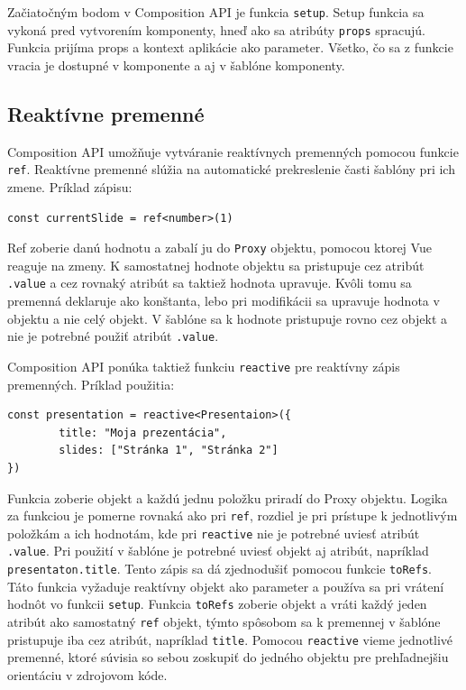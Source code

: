 Začiatočným bodom v Composition API je funkcia \texttt{setup}. Setup funkcia sa vykoná pred vytvorením komponenty, hneď ako sa atribúty \texttt{props} spracujú. Funkcia prijíma props a kontext aplikácie ako parameter. Všetko, čo sa z funkcie vracia je dostupné v komponente a aj v šablóne komponenty. 

\subsection*{Reaktívne premenné}
Composition API umožňuje vytváranie reaktívnych premenných pomocou funkcie \texttt{ref}. Reaktívne premenné slúžia na automatické prekreslenie časti šablóny pri ich zmene. Príklad zápisu: 
    \begin{verbatim}const currentSlide = ref<number>(1)\end{verbatim}
Ref zoberie danú hodnotu a zabalí ju do \texttt{Proxy} objektu, pomocou ktorej Vue reaguje na zmeny. K samostatnej hodnote objektu sa pristupuje cez atribút \texttt{.value} a cez rovnaký atribút sa taktiež hodnota upravuje. Kvôli tomu sa premenná deklaruje ako konštanta, lebo pri modifikácii sa upravuje hodnota v objektu a nie celý objekt. V šablóne sa k hodnote pristupuje rovno cez objekt a nie je potrebné použiť atribút \texttt{.value}. 

Composition API ponúka taktiež funkciu \texttt{reactive} pre reaktívny zápis premenných. Príklad použitia:
    \begin{verbatim}const presentation = reactive<Presentaion>({
        title: "Moja prezentácia",
        slides: ["Stránka 1", "Stránka 2"]
}) \end{verbatim}
Funkcia zoberie objekt a každú jednu položku priradí do Proxy objektu. Logika za funkciou je pomerne rovnaká ako pri \texttt{ref}, rozdiel je pri prístupe k jednotlivým položkám a ich hodnotám, kde pri \texttt{reactive} nie je potrebné uviesť atribút \texttt{.value}. Pri použití v šablóne je potrebné uviesť objekt aj atribút, napríklad \texttt{presentaton.title}. Tento zápis sa dá zjednodušiť pomocou funkcie \texttt{toRefs}. Táto funkcia vyžaduje reaktívny objekt ako parameter a používa sa pri vrátení hodnôt vo funkcii \texttt{setup}. Funkcia \texttt{toRefs} zoberie objekt a vráti každý jeden atribút ako samostatný \texttt{ref} objekt, týmto spôsobom sa k premennej v šablóne pristupuje iba cez atribút, napríklad \texttt{title}. Pomocou \texttt{reactive} vieme jednotlivé premenné, ktoré súvisia so sebou zoskupiť do jedného objektu pre prehľadnejšiu orientáciu v zdrojovom kóde. 

